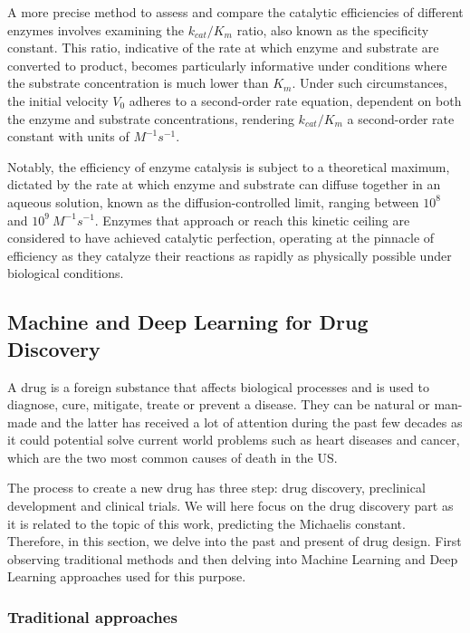 A more precise method to assess and compare the catalytic efficiencies of different enzymes involves 
examining the $k_{cat}/K_m$ ratio, also known as the specificity constant. This ratio, indicative 
of the rate at which enzyme and substrate are converted to product, becomes particularly informative 
under conditions where the substrate concentration is much lower than $K_m$. Under such circumstances, 
the initial velocity $V_0$ adheres to a second-order rate equation, dependent on both the enzyme and 
substrate concentrations, rendering $k_{cat}/K_m$ a second-order rate constant with units of 
$M^{-1}s^{-1}$.

Notably, the efficiency of enzyme catalysis is subject to a theoretical maximum, dictated by 
the rate at which enzyme and substrate can diffuse together in an aqueous solution, known as 
the diffusion-controlled limit, ranging between $10^8$ and $10^9\ M^{-1}s^{-1}$. Enzymes that 
approach or reach this kinetic ceiling are considered to have achieved catalytic perfection, 
operating at the pinnacle of efficiency as they catalyze their reactions as rapidly as physically 
possible under biological conditions.

\subsection{Machine and Deep Learning for Drug Discovery}

A drug is a foreign substance that affects biological processes and is used to diagnose, cure, mitigate, treate or prevent a disease. \cite{FDA2022Glossary} They can be natural or man-made and the latter has received a lot of attention during the past few decades as it could potential solve current world problems such as heart diseases and cancer, which are the two most common causes of death in the US. \cite{UnderlyingCauseDeath2020}

The process to create a new drug has three step: drug discovery, preclinical development and clinical trials. We will here focus on the drug discovery part as it is related to the topic of this work, predicting the Michaelis constant. Therefore, in this section, we delve into the past and present of drug design. First observing traditional methods and then delving into Machine Learning and Deep Learning approaches used for this purpose.

\subsubsection{Traditional approaches}

